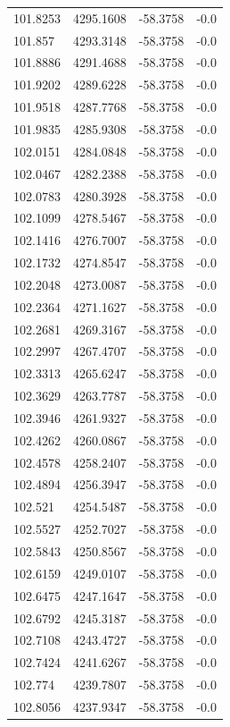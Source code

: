 \begin{table}[H]
\begin{tabular}{llll}
101.8253 & 4295.1608 & -58.3758 & -0.0 \\
101.857 & 4293.3148 & -58.3758 & -0.0 \\
101.8886 & 4291.4688 & -58.3758 & -0.0 \\
101.9202 & 4289.6228 & -58.3758 & -0.0 \\
101.9518 & 4287.7768 & -58.3758 & -0.0 \\
101.9835 & 4285.9308 & -58.3758 & -0.0 \\
102.0151 & 4284.0848 & -58.3758 & -0.0 \\
102.0467 & 4282.2388 & -58.3758 & -0.0 \\
102.0783 & 4280.3928 & -58.3758 & -0.0 \\
102.1099 & 4278.5467 & -58.3758 & -0.0 \\
102.1416 & 4276.7007 & -58.3758 & -0.0 \\
102.1732 & 4274.8547 & -58.3758 & -0.0 \\
102.2048 & 4273.0087 & -58.3758 & -0.0 \\
102.2364 & 4271.1627 & -58.3758 & -0.0 \\
102.2681 & 4269.3167 & -58.3758 & -0.0 \\
102.2997 & 4267.4707 & -58.3758 & -0.0 \\
102.3313 & 4265.6247 & -58.3758 & -0.0 \\
102.3629 & 4263.7787 & -58.3758 & -0.0 \\
102.3946 & 4261.9327 & -58.3758 & -0.0 \\
102.4262 & 4260.0867 & -58.3758 & -0.0 \\
102.4578 & 4258.2407 & -58.3758 & -0.0 \\
102.4894 & 4256.3947 & -58.3758 & -0.0 \\
102.521 & 4254.5487 & -58.3758 & -0.0 \\
102.5527 & 4252.7027 & -58.3758 & -0.0 \\
102.5843 & 4250.8567 & -58.3758 & -0.0 \\
102.6159 & 4249.0107 & -58.3758 & -0.0 \\
102.6475 & 4247.1647 & -58.3758 & -0.0 \\
102.6792 & 4245.3187 & -58.3758 & -0.0 \\
102.7108 & 4243.4727 & -58.3758 & -0.0 \\
102.7424 & 4241.6267 & -58.3758 & -0.0 \\
102.774 & 4239.7807 & -58.3758 & -0.0 \\
102.8056 & 4237.9347 & -58.3758 & -0.0 \\

\end{tabular}
\end{table}
